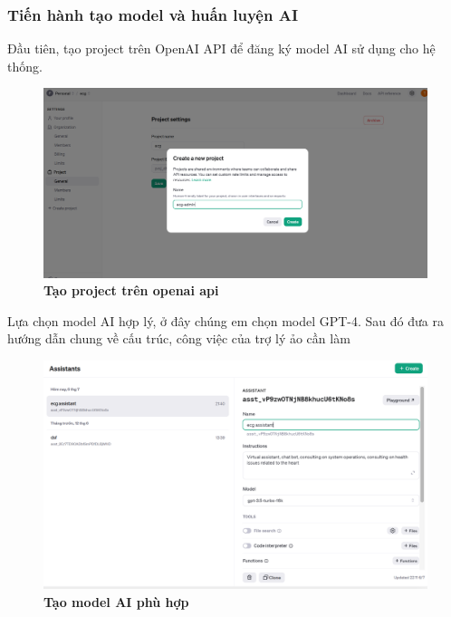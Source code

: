 \subsubsection{Tiến hành tạo model và huấn luyện AI}
Đầu tiên, tạo project trên OpenAI API để đăng ký model AI sử dụng cho hệ thống.
\begin{figure}[H]
  \centering
  \includegraphics[scale=0.4]{Images/server/ai/create-project.png}
  \caption[Tạo project trên openai api]{\bfseries \fontsize{12pt}{0pt}
  \selectfont Tạo project trên openai api}
  \label{create-ai-project} %
\end{figure}

Lựa chọn model AI hợp lý, ở đây chúng em chọn model GPT-4. Sau đó đưa ra hướng dẫn chung về cấu trúc, công việc của trợ lý ảo cần làm

\begin{figure}[H]
  \centering
  \includegraphics[scale=0.4]{Images/server/ai/create-assistant.png}
  \caption[Tạo model AI phù hợp]{\bfseries \fontsize{12pt}{0pt}
  \selectfont Tạo model AI phù hợp}
  \label{create-ai-assistant} %
\end{figure}

